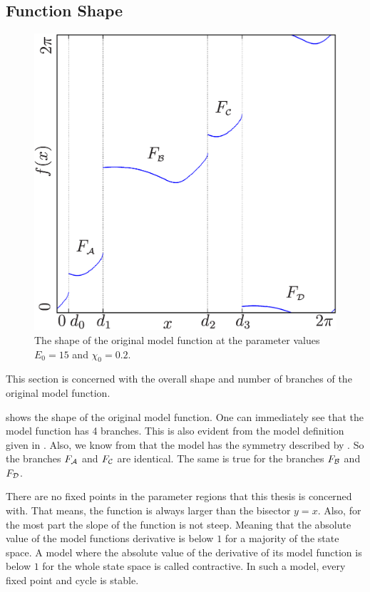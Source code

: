 \subsection{Function Shape}

\begin{figure}
	\centering
	\includegraphics[width=.5 \textwidth]{../Figures/5/5.1/illustration.png}
	\caption[Shape of the original model function]{
		The shape of the original model function at the parameter values $E_0 = 15$ and $\chi_0 = 0.2$.
	}
	\label{fig:setup.char.shape}
\end{figure}

This section is concerned with the overall shape and number of branches of the original model function.

 shows the shape of the original model function.
One can immediately see that the model function has 4 branches.
This is also evident from the model definition given in .
Also, we know from  that the model has the symmetry described by .
So the branches $F_{\mathcal{A}}$ and $F_{\mathcal{C}}$ are identical.
The same is true for the branches $F_{\mathcal{B}}$ and $F_{\mathcal{D}}$.

There are no fixed points in the parameter regions that this thesis is concerned with.
That means, the function is always larger than the bisector $y=x$.
Also, for the most part the slope of the function is not steep.
Meaning that the absolute value of the model functions derivative is below $1$ for a majority of the state space.
A model where the absolute value of the derivative of its model function is below $1$ for the whole state space is called contractive.
In such a model, every fixed point and cycle is stable.
